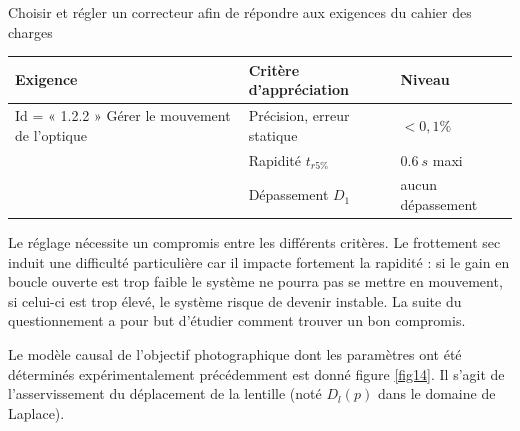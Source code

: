 \begin{obj}
Choisir et régler un correcteur afin de répondre aux exigences du cahier des charges
\end{obj}

\begin{center}
\begin{tabular}{|p{}|p{}|p{}|}
\hline 
\textbf{Exigence} & \textbf{Critère d'appréciation} & \textbf{Niveau} \\ 
\hline 
Id = « 1.2.2 » Gérer le mouvement de l'optique & Précision, erreur statique & $<0,1\%$ \\ 
\cline{2-3}
& Rapidité $t_{r5\%}$ & $\SI{0,6}{s}$ maxi \\ 
\cline{2-3}
& Dépassement $D_1$ & aucun dépassement \\ 
\hline 
\end{tabular} 
\end{center}


Le réglage nécessite un compromis
entre les différents critères. Le frottement sec induit une difficulté
particulière car il impacte fortement la rapidité : si le gain en boucle
ouverte est trop faible le système ne pourra pas se mettre en mouvement,
si celui-ci est trop élevé, le système risque de devenir instable. La
suite du questionnement a pour but d'étudier comment trouver un bon
compromis.

Le modèle causal de l'objectif photographique dont les paramètres ont
été déterminés expérimentalement précédemment est donné figure \ref{fig14}. Il s'agit de l'asservissement du déplacement de la lentille (noté $D_l(p)$ dans le domaine de Laplace).

